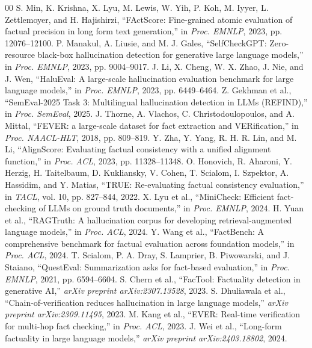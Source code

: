 \documentclass[conference]{IEEEtran}
\begin{document}

\begin{thebibliography}{00}
 S. Min, K. Krishna, X. Lyu, M. Lewis, W. Yih, P. Koh, M. Iyyer, L. Zettlemoyer, and H. Hajishirzi, ``FActScore: Fine-grained atomic evaluation of factual precision in long form text generation,'' in \textit{Proc. EMNLP}, 2023, pp. 12076--12100.
 P. Manakul, A. Liusie, and M. J. Gales, ``SelfCheckGPT: Zero-resource black-box hallucination detection for generative large language models,'' in \textit{Proc. EMNLP}, 2023, pp. 9004--9017.
 J. Li, X. Cheng, W. X. Zhao, J. Nie, and J. Wen, ``HaluEval: A large-scale hallucination evaluation benchmark for large language models,'' in \textit{Proc. EMNLP}, 2023, pp. 6449--6464.
 Z. Gekhman et al., ``SemEval-2025 Task 3: Multilingual hallucination detection in LLMs (REFIND),'' in \textit{Proc. SemEval}, 2025.
 J. Thorne, A. Vlachos, C. Christodoulopoulos, and A. Mittal, ``FEVER: a large-scale dataset for fact extraction and VERification,'' in \textit{Proc. NAACL-HLT}, 2018, pp. 809--819.
 Y. Zha, Y. Yang, R. H. R. Lin, and M. Li, ``AlignScore: Evaluating factual consistency with a unified alignment function,'' in \textit{Proc. ACL}, 2023, pp. 11328--11348.
 O. Honovich, R. Aharoni, Y. Herzig, H. Taitelbaum, D. Kukliansky, V. Cohen, T. Scialom, I. Szpektor, A. Hassidim, and Y. Matias, ``TRUE: Re-evaluating factual consistency evaluation,'' in \textit{TACL}, vol. 10, pp. 827--844, 2022.
 X. Lyu et al., ``MiniCheck: Efficient fact-checking of LLMs on ground truth documents,'' in \textit{Proc. EMNLP}, 2024.
 H. Yuan et al., ``RAGTruth: A hallucination corpus for developing retrieval-augmented language models,'' in \textit{Proc. ACL}, 2024.
 Y. Wang et al., ``FactBench: A comprehensive benchmark for factual evaluation across foundation models,'' in \textit{Proc. ACL}, 2024.
 T. Scialom, P. A. Dray, S. Lamprier, B. Piwowarski, and J. Staiano, ``QuestEval: Summarization asks for fact-based evaluation,'' in \textit{Proc. EMNLP}, 2021, pp. 6594--6604.
 S. Chern et al., ``FacTool: Factuality detection in generative AI,'' \textit{arXiv preprint arXiv:2307.13528}, 2023.
 S. Dhuliawala et al., ``Chain-of-verification reduces hallucination in large language models,'' \textit{arXiv preprint arXiv:2309.11495}, 2023.
 M. Kang et al., ``EVER: Real-time verification for multi-hop fact checking,'' in \textit{Proc. ACL}, 2023.
 J. Wei et al., ``Long-form factuality in large language models,'' \textit{arXiv preprint arXiv:2403.18802}, 2024.
\end{thebibliography}
\end{document}

